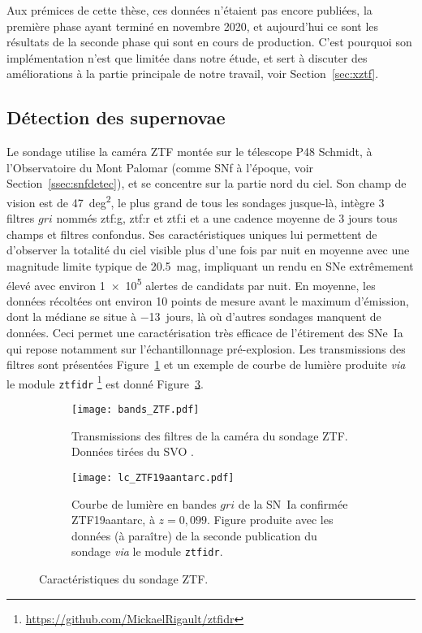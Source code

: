 \documentclass[../main/main.tex]{subfiles}
\begin{document}
Aux prémices de cette thèse, ces données n'étaient pas encore publiées, la
première phase ayant terminé en novembre 2020, et aujourd'hui ce sont les
résultats de la seconde phase qui sont en cours de production. C'est pourquoi
son implémentation n'est que limitée dans notre étude, et sert à discuter des
améliorations à la partie principale de notre travail, voir
Section~\ref{sec:xztf}.

\subsection{Détection des supernovae}\label{ssec:ztfdetec}

Le sondage utilise la caméra ZTF montée sur le télescope P48 Schmidt, à
l'Observatoire du Mont Palomar (comme SNf à l'époque, voir
Section~\ref{ssec:snfdetec}), et se concentre sur la partie nord du ciel. Son
champ de vision est de \SI{47}{deg^2}, le plus grand de tous les sondages
jusque-là, intègre 3 filtres $gri$ nommés ztf:g, ztf:r et ztf:i et a une cadence
moyenne de 3 jours tous champs et filtres confondus. Ses caractéristiques
uniques lui permettent de d'observer la totalité du ciel visible plus d'une fois
par nuit en moyenne avec une magnitude limite typique de \SI{20.5}{mag},
impliquant un rendu en SNe extrêmement élevé avec environ \num{1e5} alertes de
candidats par nuit. En moyenne, les données récoltées ont environ 10 points de
mesure avant le maximum d'émission, dont la médiane se situe à \SI{-13}{jours},
là où d'autres sondages manquent de données. Ceci permet une caractérisation
très efficace de l'étirement des SNe~Ia qui repose notamment sur
l'échantillonnage pré-explosion. Les transmissions des filtres sont présentées
Figure~\ref{fig:ztfbands} et un exemple de courbe de lumière produite
\textit{via} le module \texttt{ztfidr}
\footnote{\label{fn:ztfidr}\href{https://github.com/MickaelRigault/ztfidr}
{https://github.com/MickaelRigault/ztfidr}} est donné Figure~\ref{fig:ztflc}. 

\begin{figure}[ht]
    \centering
    \begin{subfigure}[]{.49\linewidth}
        \centering
        \texttt{[image: bands\_ZTF.pdf]}
        \caption[Transmissions des filtres de la caméra du sondage ZTF]
        {Transmissions des filtres de la caméra du sondage ZTF. Données tirées
        du SVO \citep{rodrigo2020}.}
        \label{fig:ztfbands}
    \end{subfigure}
    \begin{subfigure}[]{.49\linewidth}
        \centering
        \texttt{[image: lc\_ZTF19aantarc.pdf]}
        \caption[Courbe de lumière de la SN ZTF19aantarc]{Courbe de lumière en
            bandes $gri$ de la SN~Ia confirmée ZTF19aantarc, à $z = 0,099$.
            Figure produite avec les données (à paraître) de la seconde
            publication du sondage \textit{via} le module
        \texttt{ztfidr}.}
        \label{fig:ztflc}
    \end{subfigure}
    \caption{Caractéristiques du sondage ZTF.}
\end{figure}
\end{document}
